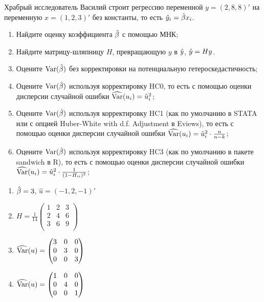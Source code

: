 \begin{problem}
Храбрый исследователь Василий строит регрессию переменной $y=(2, 8, 8)'$ на переменную $x=(1, 2, 3)'$ без константы, то есть $\hat{y}_i = \hat{\beta} x_i$.

\begin{enumerate}
  \item Найдите оценку коэффициента $\hat{\beta}$ с помощью МНК;
  \item Найдите матрицу-шляпницу $H$, превращающую $y$ в $\hat{y}$, $\hat{y} = Hy$.
  \item Оцените $\operatorname{Var}(\hat{\beta})$ без корректировки на потенциальную гетероскедастичность;
  \item Оцените $\operatorname{Var}(\hat{\beta})$ используя корректировку HC0, то есть с помощью оценки дисперсии случайной ошибки $\widehat{\operatorname{Var}}(u_i)=\hat u_i^2$;
  \item Оцените $\operatorname{Var}(\hat{\beta})$ используя корректировку HC1 (как по умолчанию в STATA или с опцией Huber-White with d.f. Adjustment в Eviews), то есть с помощью оценки дисперсии случайной ошибки $\widehat{\operatorname{Var}}(u_i)=\hat u_i^2 \cdot \frac{n}{n-k}$;
  \item Оцените $\operatorname{Var}(\hat{\beta})$ используя корректировку HC3 (как по умолчанию в пакете sandwich в R), то есть с помощью оценки дисперсии случайной ошибки $\widehat{\operatorname{Var}}(u_i)=\hat u_i^2 \cdot \frac{1}{(1-H_{ii})^2}$;
\end{enumerate}
\begin{sol}
  \begin{enumerate}
    \item $\hat{\beta} = 3$, $\hat u = (-1, 2, -1)'$
    \item $H = \frac{1}{14}\begin{pmatrix}
      1 & 2 & 3 \\
      2 & 4 & 6 \\
      3 & 6 & 9 \\
    \end{pmatrix}$
    \item $\widehat{\operatorname{Var}}(u) = \begin{pmatrix}
      3 & 0 & 0 \\
      0 & 3 & 0 \\
      0 & 0 & 3 \\
    \end{pmatrix}$
    \item $\widehat{\operatorname{Var}}(u) = \begin{pmatrix}
      1 & 0 & 0 \\
      0 & 4 & 0 \\
      0 & 0 & 1 \\
    \end{pmatrix}$

\end{enumerate}
\end{sol}
\end{problem}
